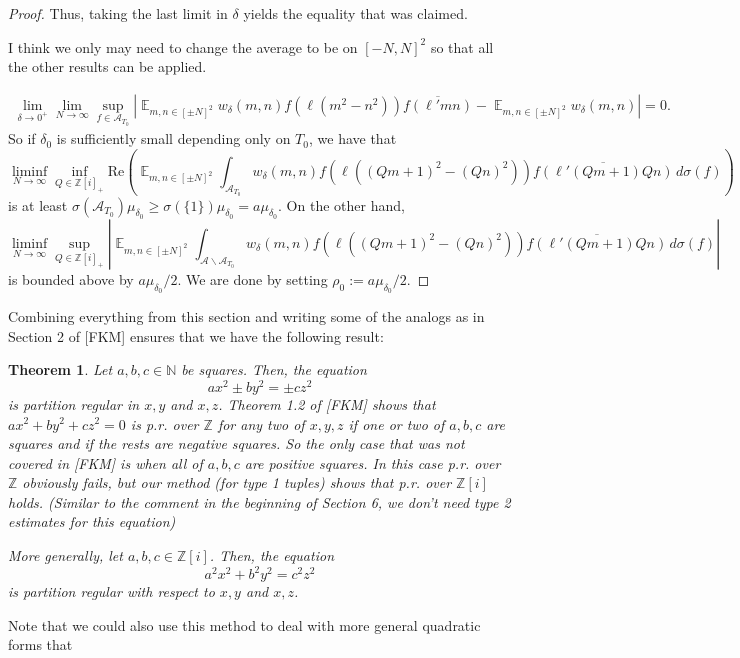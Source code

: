 \documentclass[11pt]{amsart}
\newtheorem{theorem}[lemma]{Theorem}
\theoremstyle{definition}
\DeclareMathOperator*{\E}{\mathbb{E}}
\newcommand{\N}{{\mathbb N}}
\newcommand{\Z}{{\mathbb Z}}
\begin{document}
\begin{proof}
{Thus, taking the last limit in $\delta$ yields the equality that was claimed.

I think we only may need to change the average to be on $[-N,N]^2$ so that all the other results can be applied.}
    \begin{equation}
    \begin{split}
        \lim_{\delta\to 0^{+}}\lim_{N\to\infty}\sup_{f\in \mathcal{A}_{T_{0}}} \left| \E_{m,n\in  [\pm N]^{2}}w_{\delta}(m,n)f(\ell(m^{2}-n^{2}))\overline{f(\ell'mn)}-\E_{m,n\in  [\pm N]^{2}}w_{\delta}(m,n)\right|=0.
    \end{split}
\end{equation}
So if $\delta_{0}$ is sufficiently small depending only on $T_{0}$, we have that
$$\liminf_{N\to\infty}\inf_{Q\in\Z[i]_{+}}\text{Re}\left(\E_{m,n\in [\pm N]^{2}}\int_{\mathcal{A}_{T_{0}}}w_{\delta}(m,n)f(\ell((Qm+1)^2-(Qn)^2))\overline{f(\ell'(Qm+1)Qn)}\,d\sigma(f)\right)$$
is at least $\sigma(\mathcal{A}_{T_{0}})\mu_{\delta_{0}}\geq \sigma(\{1\})\mu_{\delta_{0}}=a\mu_{\delta_{0}}$.
On the other hand, 
$$\liminf_{N\to\infty}\sup_{Q\in\Z[i]_{+}}\left|\E_{m,n\in [\pm N]^{2}}\int_{\mathcal{A}\backslash\mathcal{A}_{T_{0}}}w_{\delta}(m,n)f(\ell((Qm+1)^2-(Qn)^2))\overline{f(\ell'(Qm+1)Qn)}\,d\sigma(f)\right|$$
is bounded above by $a\mu_{\delta_{0}}/2$. We are done by setting $\rho_{0}:=a\mu_{\delta_{0}}/2$.
\end{proof}

{\color{red}
Combining everything from this section and writing some of the analogs as in Section 2 of [FKM] ensures that we have the following result:
\begin{theorem}
Let $a, b, c \in \N$ be squares. Then, the equation
\[
ax^2\pm by^2 = \pm cz^2
\]
is partition regular in $x, y$ and $x, z$. 
{\color{blue} Theorem 1.2 of [FKM] shows that $ax^{2}+by^{2}+cz^{2}=0$ is p.r. over $\mathbb{Z}$ for any two of $x,y,z$ if one or two of $a,b,c$ are squares and if the rests are negative squares. So the only case that was not covered in [FKM] is when all of $a,b,c$ are positive squares. In this case p.r. over $\mathbb{Z}$ obviously fails, but our method (for type 1 tuples) shows that p.r. over $\mathbb{Z}[i]$ holds. (Similar to the comment in the beginning of Section 6, we don't need type 2 estimates for this equation)
}

More generally, let $a,b,c \in \Z[i]$. Then, the equation
\[
a^2x^2+b^2y^2=c^2z^2
\]
is partition regular with respect to $x, y$ and $x, z$.
\end{theorem}
Note that we could also use this method to deal with more general quadratic forms that 
}
\end{document}
